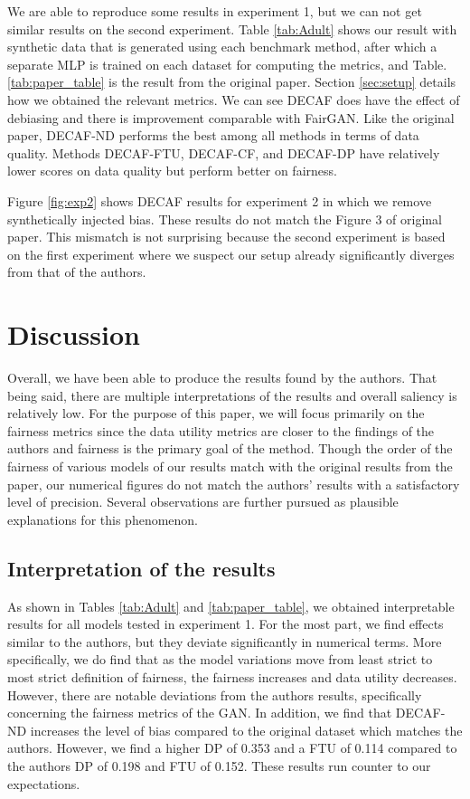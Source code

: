 \label{sec:results}

We are able to reproduce some results in experiment 1, but we can not get similar results on the second experiment. Table \ref{tab:Adult} shows our result with synthetic data that is generated using each benchmark method, after which a separate MLP is trained on each dataset for computing the metrics, and Table.\ref{tab:paper_table} is the result from the original paper. Section \ref{sec:setup} details how we obtained the relevant metrics. We can see DECAF does have the effect of debiasing and there is improvement comparable with FairGAN. Like the original paper, DECAF-ND performs the best among all methods in terms of data quality. Methods DECAF-FTU, DECAF-CF, and DECAF-DP have relatively lower scores on data quality but perform better on fairness.

Figure \ref{fig:exp2} shows DECAF results for experiment 2 in which we remove synthetically injected bias. These results do not match the Figure 3 of original paper. This mismatch is not surprising because the second experiment is based on the first experiment where we suspect our setup already significantly diverges from that of the authors.

\section{Discussion}

Overall, we have been able to produce the results found by the authors. That being said, there are multiple interpretations of the results and overall saliency is relatively low. For the purpose of this paper, we will focus primarily on the fairness metrics since the data utility metrics are closer to the findings of the authors and fairness is the primary goal of the method. Though the order of the fairness of various models of our results match with the original results from the paper, our numerical figures do not match the authors' results with a satisfactory level of precision. Several observations are further pursued as plausible explanations for this phenomenon. 

\subsection{Interpretation of the results}

As shown in Tables \ref{tab:Adult} and \ref{tab:paper_table}, we obtained interpretable results for all models tested in experiment 1. For the most part, we find effects similar to the authors, but they deviate significantly in numerical terms. More specifically, we do find that as the model variations move from least strict to most strict definition of fairness, the fairness increases and data utility decreases. However, there are notable deviations from the authors results, specifically concerning the fairness metrics of the GAN. In addition, we find that DECAF-ND increases the level of bias compared to the original dataset which matches the authors. However, we find a higher DP of 0.353 and a FTU of 0.114 compared to the authors DP of 0.198 and FTU of 0.152. These results run counter to our expectations. 

